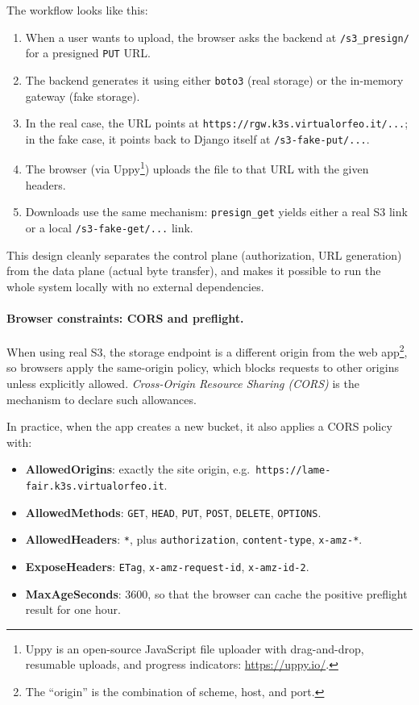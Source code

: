 The workflow looks like this:
\begin{enumerate}
	\item When a user wants to upload, the browser asks the backend at \texttt{/s3\_presign/} for a presigned \texttt{PUT} URL.  
	\item The backend generates it using either \texttt{boto3} (real storage) or the in-memory gateway (fake storage).  
	\item In the real case, the URL points at \texttt{https://rgw.k3s.virtualorfeo.it/...}; 
	in the fake case, it points back to Django itself at \texttt{/s3-fake-put/...}.  
	\item The browser (via Uppy\footnote{Uppy is an open-source JavaScript file uploader with drag-and-drop, 
		resumable uploads, and progress indicators: \url{https://uppy.io/}.}) 
	uploads the file to that URL with the given headers.  
	\item Downloads use the same mechanism: \texttt{presign\_get} yields either a real S3 link or a local \texttt{/s3-fake-get/...} link.  
\end{enumerate}

This design cleanly separates the control plane (authorization, URL generation) from the data plane (actual byte transfer), 
and makes it possible to run the whole system locally with no external dependencies.

\paragraph{Browser constraints: CORS and preflight.}
When using real S3, the storage endpoint is a different origin from the web app\footnote{The ``origin'' is the combination of scheme, host, and port.}, 
so browsers apply the same-origin policy, which blocks requests to other origins unless explicitly allowed.  
\emph{Cross-Origin Resource Sharing (CORS)} is the mechanism to declare such allowances.  

In practice, when the app creates a new bucket, it also applies a CORS policy with:
\begin{itemize}
	\item \textbf{AllowedOrigins}: exactly the site origin, e.g.\ \texttt{https://lame-fair.k3s.virtualorfeo.it}.  
	\item \textbf{AllowedMethods}: \texttt{GET}, \texttt{HEAD}, \texttt{PUT}, \texttt{POST}, \texttt{DELETE}, \texttt{OPTIONS}.  
	\item \textbf{AllowedHeaders}: \texttt{*}, plus \texttt{authorization}, \texttt{content-type}, \texttt{x-amz-*}.  
	\item \textbf{ExposeHeaders}: \texttt{ETag}, \texttt{x-amz-request-id}, \texttt{x-amz-id-2}.  
	\item \textbf{MaxAgeSeconds}: 3600, so that the browser can cache the positive preflight result for one hour.  
\end{itemize}

